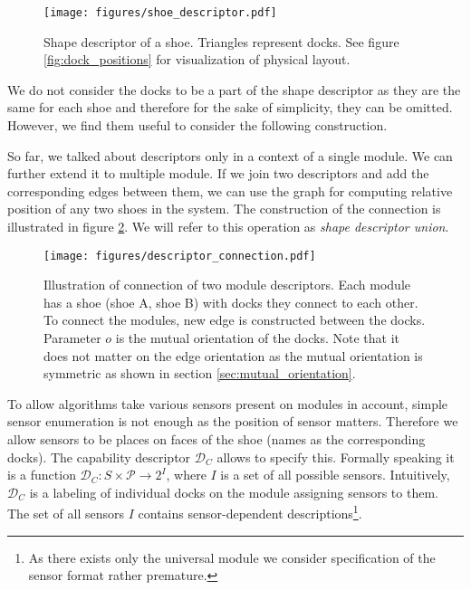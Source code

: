 \begin{figure}[h!]
    \centering
    \texttt{[image: figures/shoe\_descriptor.pdf]}
    \caption{Shape descriptor of a shoe. Triangles represent docks. See figure
    \ref{fig:dock_positions} for visualization of physical layout.}
    \label{fig:shoe_descriptor}
\end{figure}

We do not consider the docks to be a part of the shape descriptor as they are
the same for each shoe and therefore for the sake of simplicity, they can be
omitted. However, we find them useful to consider the following construction.

So far, we talked about descriptors only in a context of a single module. We can
further extend it to multiple module. If we join two descriptors and add the
corresponding edges between them, we can use the graph for computing relative
position of any two shoes in the system. The construction of the connection is
illustrated in figure \ref{fig:connection_descriptor}. We will refer to this
operation as \emph{shape descriptor union}.

\begin{figure}[h!]
    \centering
    \texttt{[image: figures/descriptor\_connection.pdf]}
    \caption{Illustration of connection of two module descriptors. Each module
    has a shoe (shoe A, shoe B) with docks they connect to each other. To
    connect the modules, new edge is constructed between the docks. Parameter
    $o$ is the mutual orientation of the docks. Note that it does not matter on
    the edge orientation as the mutual orientation is symmetric as shown in
    section \ref{sec:mutual_orientation}. }
    \label{fig:connection_descriptor}
\end{figure}


To allow algorithms take various sensors present on modules in account, simple
sensor enumeration is not enough as the position of sensor matters. Therefore we
allow sensors to be places on faces of the shoe (names as the corresponding
docks). The capability descriptor $\mathcal{D}_C$ allows to specify this.
Formally speaking it is a function $\mathcal{D}_C: S\times\mathcal{P}
\rightarrow 2^{I}$, where $I$ is a set of all possible sensors. Intuitively,
$\mathcal{D}_C$ is a labeling of individual docks on the module assigning
sensors to them. The set of all sensors $I$ contains sensor-dependent
descriptions\footnote{As there exists only the universal module we consider
specification of the sensor format rather premature.}.

